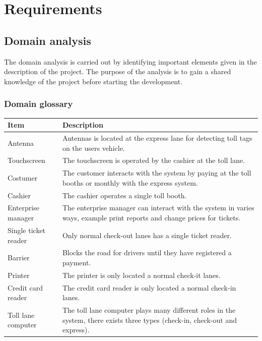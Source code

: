 \chapter{Requirements}
\section{Domain analysis}
The domain analysis is carried out by identifying important elements given in the description of the project. The purpose of the analysis is to gain a shared knowledge of the project before starting the development.

\subsection{Domain glossary}
\begin{center}
\begin{table}[!ht]
    \centering
    \begin{tabular}{ | l | p{10cm} | }
    \hline
    \textbf{Item}           &   \textbf{Description} \\ \hline
    Antenna                 &   Antennas is located at the express lane for detecting toll tags on the users vehicle. \\ \hline
    Touchscreen             &   The touchscreen is operated by the cashier at the toll lane. \\ \hline
    Costumer                &   The customer interacts with the system by paying at the toll booths or monthly with the express system. \\ \hline
    Cashier                 &   The cashier operates a single toll booth. \\ \hline
    Enterprise manager      &   The enterprise manager can interact with the system in varies ways, example print reports and change prices for tickets. \\ \hline
    Single ticket reader    &   Only normal check-out lanes has a single ticket reader. \\ \hline
    Barrier                 &   Blocks the road for drivers until they have registered a payment. \\ \hline
    Printer                 &   The printer is only located a normal check-it lanes. \\ \hline
    Credit card reader      &   The credit card reader is only located a normal check-in lanes. \\ \hline
    Toll lane computer      &   The toll lane computer plays many different roles in the system, there exists three types (check-in, check-out and express). \\ \hline

\end{tabular}
\end{table}
\end{center}
